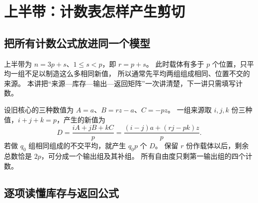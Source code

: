 \chapter{上半带：计数表怎样产生剪切}\label{app:upper}

\section{把所有计数公式放进同一个模型}
上半带为 $n=3p+s$、$1\le s<p$，即 $r=p+s$。
此时载体有多于 $p$ 个位置，只平均一组不足以制造这么多相同新值，
所以通常先平均两组组成相同、位置不交的来源。
本讲把“来源—库存—输出—返回矩阵”一次讲清楚，下一讲只需填写计数。

设旧核心的三种数值为 $A=a$、$B=rz-a$、$C=-pz$。
一组来源取 $i,j,k$ 份三种值，$i+j+k=p$，产生的新值为
\[
D=\frac{iA+jB+kC}{p}
 =\frac{(i-j)a+(rj-pk)z}{p}.
\]
若做 $q_0$ 组相同组成的不交平均，就产生 $q_0p$ 个 $D$。
保留 $r$ 份作载体以后，剩余总数恰是 $2p$，可分成一个输出组及其补组。
所有自由度只剩第一输出组的四个计数。

\section{逐项读懂库存与返回公式}

